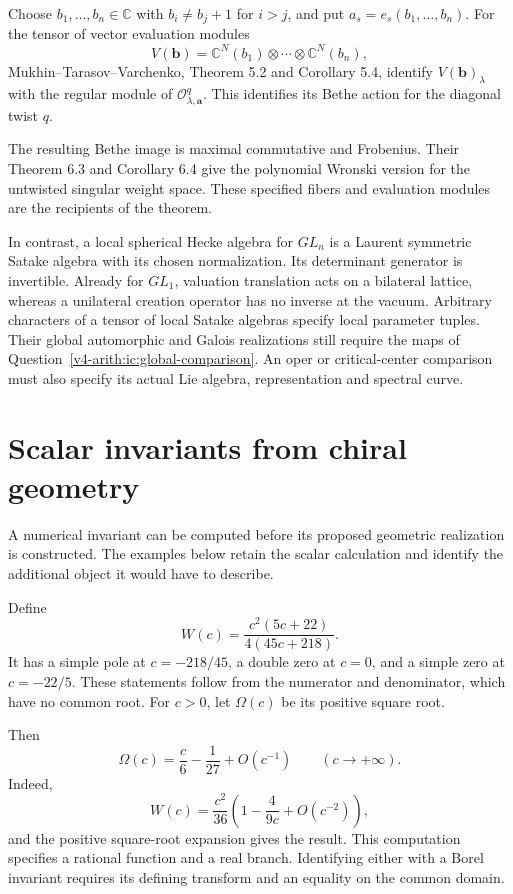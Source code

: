 Choose \(b_1,\ldots,b_n\in\mathbb C\) with
\(b_i\ne b_j+1\) for \(i>j\), and put
\(a_s=e_s(b_1,\ldots,b_n)\).
For the tensor of vector evaluation modules
\[
 V(\mathbf b)=\mathbb C^N(b_1)\otimes\cdots
                              \otimes\mathbb C^N(b_n),
\]
Mukhin--Tarasov--Varchenko, Theorem 5.2 and Corollary 5.4,
identify \(V(\mathbf b)_\lambda\) with the regular module of
\(\mathcal O_{\lambda,\mathbf a}^q\).
This identifies its Bethe action for the diagonal twist \(q\).

The resulting Bethe image is maximal commutative and Frobenius.
Their Theorem 6.3 and Corollary 6.4 give the polynomial
Wronski version for the untwisted singular weight space.
These specified fibers and evaluation modules are the recipients
of the theorem.

In contrast, a local spherical Hecke algebra for \(GL_n\) is a
Laurent symmetric Satake algebra with its chosen normalization.
Its determinant generator is invertible.
Already for \(GL_1\), valuation translation acts on a bilateral
lattice, whereas a unilateral creation operator has no inverse
at the vacuum.
Arbitrary characters of a tensor of local Satake algebras specify
local parameter tuples. Their global automorphic and Galois
realizations still require the maps of
Question~\ref{v4-arith:ic:global-comparison}.
An oper or critical-center comparison must also specify its
actual Lie algebra, representation and spectral curve.

\section{Scalar invariants from chiral geometry}
\label{v4-arith:ic:scalar-examples}

A numerical invariant can be computed before its proposed geometric
realization is constructed. The examples below retain the scalar
calculation and identify the additional object it would have to describe.

\begin{example}
\label{v4-arith:ic:rational-shadow}
Define
\[
 W(c)=\frac{c^2(5c+22)}{4(45c+218)}.
\]
It has a simple pole at \(c=-218/45\), a double zero at \(c=0\),
and a simple zero at \(c=-22/5\). These statements follow from
the numerator and denominator, which have no common root.
For \(c>0\), let \(\Omega(c)\) be its positive square root.

Then
\[
 \Omega(c)=\frac c6-\frac1{27}+O(c^{-1})
       \qquad(c\longrightarrow+\infty).
\]
Indeed,
\[
 W(c)=\frac{c^2}{36}
       \left(1-\frac4{9c}+O(c^{-2})\right),
\]
and the positive square-root expansion gives the result.
This computation specifies a rational function and a real branch.
Identifying either with a Borel invariant requires its defining
transform and an equality on the common domain.
\end{example}


